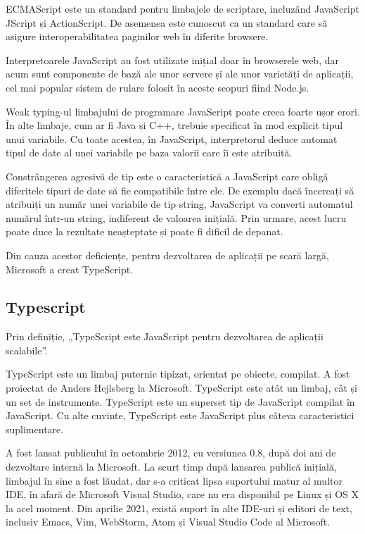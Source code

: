 \documentclass[a4paper,12pt]{article}
\begin{document}
    ECMAScript este un standard pentru limbajele de scriptare, incluzând JavaScript JScript și ActionScript. De asemenea este cunoscut ca un standard
    care să asigure interoperabilitatea paginilor web în diferite browsere.

    Interpretoarele JavaScript au fost utilizate inițial doar în browserele web, dar acum sunt componente de bază ale unor servere și ale unor
    varietăți de aplicații, cel mai popular sistem de rulare folosit în aceste scopuri fiind Node.js.
    
    Weak typing-ul limbajului de programare JavaScript poate creea foarte ușor erori. În alte limbaje, cum ar fi Java și C++, trebuie specificat
    în mod explicit tipul unui variabile. Cu toate acestea, în JavaScript, interpretorul deduce automat tipul de date
    al unei variabile pe baza valorii care îi este atribuită.

    Constrângerea agresivă de tip este o caracteristică a JavaScript care obligă diferitele tipuri de date să fie compatibile între ele. De exemplu
    dacă încercați să atribuiți un număr unei variabile de tip string, JavaScript va converti automatul numărul într-un string, indiferent de valoarea inițială.
    Prin urmare, acest lucru poate duce la rezultate neașteptate și poate fi dificil de depanat.

    Din cauza acestor deficiențe, pentru dezvoltarea de aplicații pe scară largă, Microsoft a creat TypeScript.
    \subsection{Typescript}
    Prin definiție, „TypeScript este JavaScript pentru dezvoltarea de aplicații scalabile”.
    
    TypeScript este un limbaj puternic tipizat, orientat pe obiecte, compilat. A fost proiectat de Anders Hejlsberg
    la Microsoft. TypeScript este atât un limbaj, cât și un set de instrumente. TypeScript este un superset tip de JavaScript compilat 
    în JavaScript. Cu alte cuvinte, TypeScript este JavaScript plus câteva caracteristici suplimentare.
    
    A fost lansat publicului în octombrie 2012, cu versiunea 0.8, după doi ani de dezvoltare internă la Microsoft.
    La scurt timp după lansarea publică inițială, limbajul în sine a fost lăudat, dar s-a criticat lipsa suportului matur al multor IDE,
    în afară de Microsoft Visual Studio, care nu era disponibil pe Linux și OS X la acel moment. Din aprilie 2021, există suport
    în alte IDE-uri și editori de text, inclusiv Emacs, Vim, WebStorm, Atom și Visual Studio Code al Microsoft.
    
\end{document}
